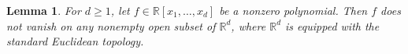 \documentclass[12pt,reqno]{amsart}
\newtheorem{lem}[thm]{Lemma}
\theoremstyle{definition}
\numberwithin{equation}{subsection}
\numberwithin{equation}{section}
\begin{document}



    


\begin{lem}\label{avoidance}
For $d\ge 1$, let $f\in \mathbb{R}[x_1,\dots,x_d]$ be a nonzero polynomial. Then $f$ does not vanish on any nonempty open subset of $\mathbb{R}^d$, where $\mathbb{R}^d$ is equipped with the standard Euclidean topology.
\end{lem}
\end{document}
